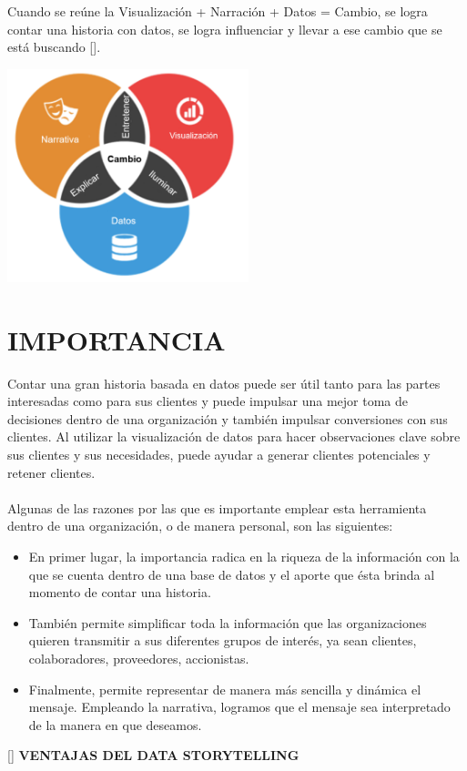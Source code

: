 \documentclass[preprint,12pt]{elsarticle}
\begin{document}
	Cuando se reúne la Visualización + Narración + Datos = Cambio, se logra contar una historia con datos, se logra influenciar y llevar a ese cambio que se está buscando [].
	
	\begin{center}
		\includegraphics[width=7cm]{./Imagenes/img2} 
	\end{center}

\section{IMPORTANCIA}
	
	Contar una gran historia basada en datos puede ser útil tanto para las partes interesadas como para sus clientes y puede impulsar una mejor toma de decisiones dentro de una organización y también impulsar conversiones con sus clientes. Al utilizar la visualización de datos para hacer observaciones clave sobre sus clientes y sus necesidades, puede ayudar a generar clientes potenciales y retener clientes.\\
	\\
	Algunas de las razones por las que es importante emplear esta herramienta dentro de una organización, o de manera personal, son las siguientes:
	
	\begin{itemize}
		\item En primer lugar, la importancia radica en la riqueza de la información con la que se cuenta dentro de una base de datos y el aporte que ésta brinda al momento de contar una historia.
		\item También permite simplificar toda la información que las organizaciones quieren transmitir a sus diferentes grupos de interés, ya sean clientes, colaboradores, proveedores, accionistas.
		\item Finalmente, permite representar de manera más sencilla y dinámica el mensaje. Empleando la narrativa, logramos que el mensaje sea interpretado de la manera en que deseamos.
	\end{itemize}
	[]
	\textbf{VENTAJAS DEL DATA STORYTELLING}\\
	
\end{document}
